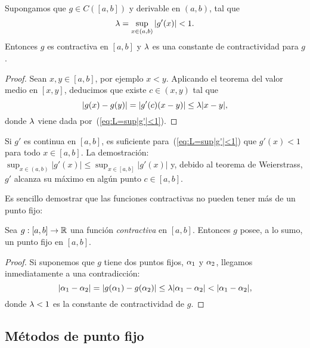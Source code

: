 \begin{proposition}
  \label{pro:1}
  Supongamos que $g\in C([a,b])$ y derivable en $(a,b)$, tal que
  \begin{equation}
    \lambda=\sup_{x\in(a,b)} |g'(x)|<1.
    \label{eq:L=sup|g'|<1}
  \end{equation}
  Entonces $g$ es contractiva en $[a,b]$ y $\lambda$ es una
  constante de contractividad para $g$.
\end{proposition}
\begin{proof}
  Sean $x,y\in [a,b]$, por ejemplo $x<y$. Aplicando el teorema del
  valor medio en $[x,y]$, deducimos que existe $c\in (x,y)$ tal que
  \begin{equation*}
    |g(x)-g(y)|=|g'(c)(x-y)| \le \lambda |x-y|,
  \end{equation*}
  donde $\lambda$ viene dada por~(\ref{eq:L=sup|g'|<1}).
\end{proof}

\begin{remark}
  Si $g'$ es continua en $[a,b]$, es suficiente
  para~(\ref{eq:L=sup|g'|<1}) que $g'(x)<1$ para todo $x\in[a,b]$.
  La demostración: $\sup_{x\in(a,b)}|g'(x)| \le \sup_{x\in[a,b]}
  |g'(x)|$ y, debido al teorema de Weierstrass, $g'$ alcanza su máximo
  en algún punto $c\in [a,b]$.
  \label{rk:3}
\end{remark}
Es sencillo demostrar que las funciones contractivas no pueden tener
más de un punto fijo:

\begin{proposition}
  \label{pro:unicidad-punto-fijo}
  Sea $g:[a,b]\to\operatorname{{\mathbb R}}$ una función \emph{contractiva} en
  $[a,b]$. Entonces $g$ posee, a lo sumo, un punto fijo en $[a,b]$.
\end{proposition}

\begin{proof}
  Si suponemos que $g$ tiene dos puntos fijos, $\alpha_1$ y
  $\alpha_2$, llegamos inmediatamente a una contradicción:
  $$
  |\alpha_1-\alpha_2| = |g(\alpha_1)-g(\alpha_2)| \le \lambda |\alpha_1 -
  \alpha_2| < |\alpha_1-\alpha_2|,$$
  donde $\lambda<1$ es la constante de contractividad de $g$.
\end{proof}

\subsection*{Métodos de punto fijo}

